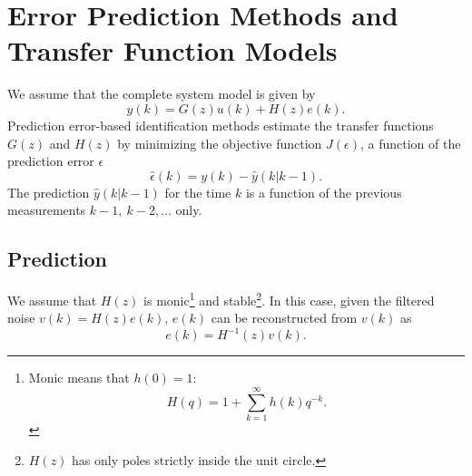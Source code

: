 \chapter{Error Prediction Methods and Transfer Function Models}
\label{chap:error-prediction-methods-tf}

We assume that the complete system model is given by
\begin{equation}
  \label{eq:PEM-tf-models}
  y(k) = G(z)u(k) + H(z)e(k).
\end{equation}
Prediction error-based identification methods estimate the transfer functions $G(z)$ and $H(z)$ by minimizing the objective function $J(\epsilon)$, a function of the prediction error $\epsilon$
\begin{equation*}
  \hat{\epsilon}(k) = y(k) - \hat{y}(k|k-1).
\end{equation*}
The prediction $\hat{y}(k|k-1)$ for the time $k$ is a function of the previous measurements $k-1,\ k-2,\ldots$ only.

\section{Prediction}
\label{sec:prediction}

We assume that $H(z)$ is monic\footnote{Monic means that $h(0)=1$:
\begin{equation*}
  H(q) = 1 + \sum_{k=1}^\infty h(k)q^{-k}.
\end{equation*}} and stable\footnote{$H(z)$ has only poles strictly inside the unit circle.}. In this case, given the filtered noise $v(k)=H(z)e(k)$, $e(k)$ can be reconstructed from $v(k)$ as
\begin{equation}
  \label{eq:noise-reconstruction}
  e(k) = H^{-1}(z)v(k).
\end{equation}

